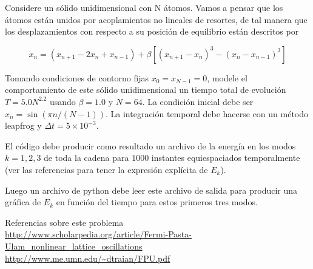 \documentclass[11pt,letterpaper]{exam}
\begin{document}
\begin{questions}

Considere un s\'olido unidimensional con N \'atomos.
Vamos a pensar que los \'atomos est\'an unidos por acoplamientos no
lineales de resortes, de tal manera que los desplazamientos con respecto
a su posici\'on de equilibrio est\'an descritos por

\begin{equation}
\ddot{x}_n = (x_{n+1} - 2x_n + x_{n-1}) + \beta[(x_{n+1}-x_n)^3 - (x_n - x_{n-1})^3]
\end{equation}

Tomando condiciones de contorno fijas $x_{0}=x_{N-1}=0$, modele el comportamiento
de este s\'olido unidimensional un tiempo total de evoluci\'on $T=5.0N^{2.2}$
usando $\beta=1.0$ y $N=64$. La condici\'on inicial debe ser
$x_n = \sin(\pi n/(N-1))$. La integraci\'on
temporal debe hacerse con un m\'etodo leapfrog y $\Delta t=5\times 10^{-3}$.

El c\'odigo debe producir como resultado un archivo de la energ\'ia en los modos $k=1,2,3$ de toda la cadena para $1000$ instantes equiespaciados
temporalmente (ver las referencias para tener la expresi\'on
expl\'icita de $E_k$).

Luego un archivo de python debe leer este archivo de salida para
producir una gr\'afica de $E_k$ en funci\'on del tiempo para estos
primeros tres modos.  

Referencias sobre este problema\\
\url{http://www.scholarpedia.org/article/Fermi-Pasta-Ulam_nonlinear_lattice_oscillations}\\
\url{http://www.me.umn.edu/~dtraian/FPU.pdf}\\
\end{questions}
\end{document}
